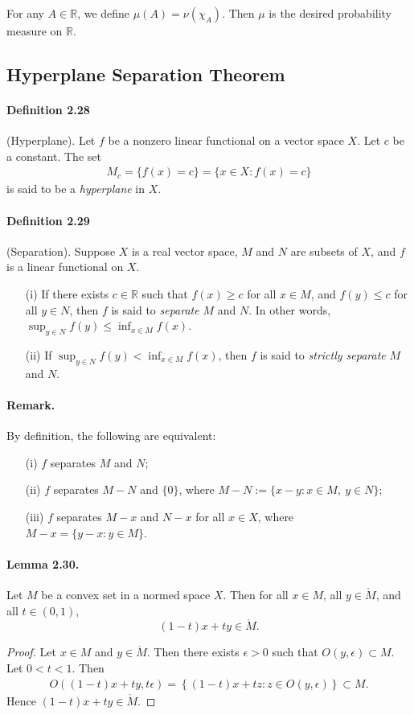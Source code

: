 \documentclass{article}
\begin{document}
For any $A\in\mathbb{R}$, we define $\mu(A)=\nu(\chi_A)$. Then $\mu$ is the desired probability measure on $\mathbb{R}$.

\newpage
\subsection{Hyperplane Separation Theorem}
\paragraph{Definition 2.28\label{def:2.28}} (Hyperplane). Let $f$ be a nonzero linear functional on a vector space $X$. Let $c$ be a constant. The set
\begin{align*}
	M_c=\{f(x)=c\}=\{x\in X:f(x)=c\}
\end{align*}
is said to be a \textit{hyperplane} in $X$.
\paragraph{Definition 2.29\label{def:2.29}} (Separation). Suppose $X$ is a real vector space, $M$ and $N$ are subsets of $X$, and $f$ is a linear functional on $X$.
\begin{itemize}
	\item[(i)] If there exists $c\in\mathbb{R}$ such that $f(x)\geq c$ for all $x\in M$, and $f(y)\leq c$ for all $y\in N$, then $f$ is said to \textit{separate} $M$ and $N$. In other words, $\sup_{y\in N}f(y)\leq\inf_{x\in M}f(x)$.
	\item[(ii)] If $\sup_{y\in N}f(y) < \inf_{x\in M}f(x)$, then $f$ is said to \textit{strictly separate} $M$ and $N$.
\end{itemize}

\paragraph{Remark.} By definition, the following are equivalent:
\begin{itemize}
	\item[(i)] $f$ separates $M$ and $N$; 
	\item[(ii)] $f$ separates $M-N$ and $\{0\}$, where $M-N:=\{x-y:x\in M,\ y\in N\}$; 
	\item[(iii)] $f$ separates $M-x$ and $N-x$ for all $x\in X$, where $M-x=\{y-x:y\in M\}$.
\end{itemize} 

\paragraph{Lemma 2.30.\label{lemma:2.30}} Let $M$ be a convex set in a normed space $X$. Then for all $x\in M$, all $y\in\mathring{M}$, and all $t\in(0,1)$, $$(1-t)x+ty\in\mathring{M}.$$
\begin{proof}
Let $x\in M$ and $y\in\mathring{M}$. Then there exists $\epsilon>0$ such that $O(y,\epsilon)\subset M$. Let $0<t<1$. Then
\begin{align*}
	O((1-t)x+ty,t\epsilon) = \left\{(1-t)x+tz:z\in O(y,\epsilon)\right\}\subset M.
\end{align*}
Hence $(1-t)x+ty\in\mathring{M}$.
\end{proof}
\end{document}
